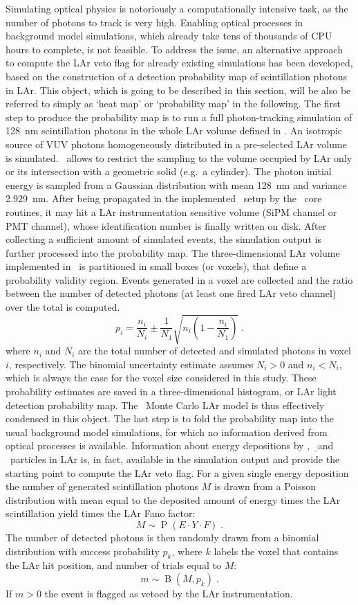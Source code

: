 Simulating optical physics is notoriously a computationally intensive task, as the number
of photons to track is very high. Enabling optical processes in background model
simulations, which already take tens of thousands of CPU hours to complete, is not
feasible. To address the issue, an alternative approach to compute the LAr veto flag for
already existing simulations has been developed, based on the construction of a detection
probability map of scintillation photons in LAr. This object, which is going to be
described in this section, will be also be referred to simply as `heat map' or
`probability map' in the following.
\newpar
The first step to produce the probability map is to run a full photon-tracking simulation
of 128~nm scintillation photons in the whole LAr volume defined in \mage. An isotropic
source of VUV photons homogeneously distributed in a pre-selected LAr volume is simulated.
\mage\ allows to restrict the sampling to the volume occupied by LAr only or its
intersection with a geometric solid (e.g.~a cylinder). The photon initial energy is
sampled from a Gaussian distribution with mean 128~nm and variance 2.929~nm. After being
propagated in the implemented \gerda\ setup by the \geant\ core routines, it may hit a
LAr instrumentation sensitive volume (SiPM channel or PMT channel), whose identification
number is finally written on disk. After collecting a sufficient amount of simulated
events, the simulation output is further processed into the probability map. The
three-dimensional LAr volume implemented in \mage\ is partitioned in small boxes (or voxels),
that define a probability validity region. Events generated in a voxel are collected and
the ratio between the number of detected photons (at least one fired LAr veto channel)
over the total is computed.
\[
  p_i = \frac{n_i}{N_i} \pm \frac{1}{N_1}\sqrt{n_i \left(1 - \frac{n_i}{N_1} \right)} \;.
\]
where $n_i$ and $N_i$ are the total number of detected and simulated photons in voxel $i$,
respectively. The binomial uncertainty estimate assumes $N_i>0$ and $n_i<N_i$, which is
always the case for the voxel size considered in this study.  These probability estimates
are saved in a three-dimensional histogram, or LAr light detection probability map. The
\gerda\ Monte Carlo LAr model is thus effectively condensed in this object.
\newpar
The last step is to fold the probability map into the usual background model simulations,
for which no information derived from optical processes is available. Information about
energy depositions by \g, \b\ and \a\ particles in LAr is, in fact, available in the
simulation output and provide the starting point to compute the LAr veto flag. For a given
single energy deposition the number of generated scintillation photons $M$ is drawn from a
Poisson distribution with mean equal to the deposited amount of energy times the LAr
scintillation yield times the LAr Fano factor:
\[
  M \sim \operatorname{P}(E \cdot Y \cdot F) \;.
\]
The number of detected photons is then randomly drawn from a binomial distribution with
success probability $p_k$, where $k$ labels the voxel that contains the LAr hit position,
and number of trials equal to $M$:
\[
  m \sim \operatorname{B}(M, p_k) \;.
\]
If $m>0$ the event is flagged as vetoed by the LAr instrumentation.

